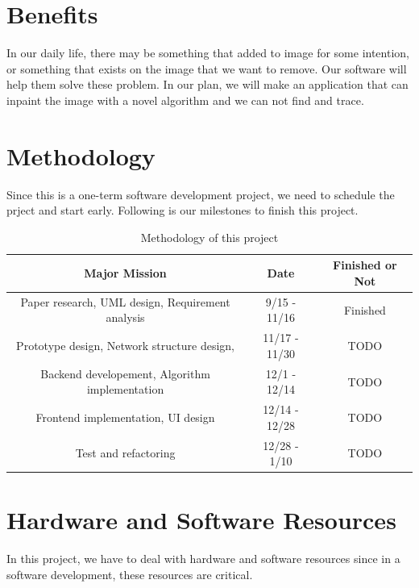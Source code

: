 \documentclass[12pt]{article}
\begin{document}
\section{Benefits}
\qquad In our daily life, there may be something that added to image for some intention, or something that exists on the image that we want to remove. Our software will help them solve these problem. In our plan, we will make an application that can inpaint the image with a novel algorithm and we can not find and trace. 
\section{Methodology}
Since this is a one-term software development project, we need to schedule the prject and start early. Following is our milestones to finish this project.
\begin{table}[H]
	\hspace{-1cm}
	\begin{tabular}{|c|c|c|}
		\hline
		Major Mission & Date & Finished or Not \\
		\hline
		Paper research, UML design, Requirement analysis
		& 9/15 - 11/16& Finished \\
		\hline
		 Prototype design, Network structure design, 
		 & 11/17 - 11/30 & TODO \\
		\hline
		 Backend developement, Algorithm implementation & 12/1 - 12/14 & TODO\\
		\hline
		 Frontend implementation, UI design & 12/14 - 12/28 & TODO\\
		\hline
		 Test and refactoring & 12/28 - 1/10 & TODO\\
		\hline 
	\end{tabular}
	\caption{Methodology of this project}
\end{table}


\section{Hardware and Software Resources}
In this project, we have to deal with hardware and software resources since 
in a software development, these resources are critical.
\end{document}
